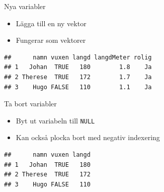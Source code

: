 \documentclass[
  11pt,
  ignorenonframetext,
]{beamer}
\newenvironment{Shaded}{\begin{snugshade}}{\end{snugshade}}
\newcommand{\DecValTok}[1]{\textcolor[rgb]{0.00,0.00,0.81}{#1}}
\newcommand{\FloatTok}[1]{\textcolor[rgb]{0.00,0.00,0.81}{#1}}
\newcommand{\KeywordTok}[1]{\textcolor[rgb]{0.13,0.29,0.53}{\textbf{#1}}}
\newcommand{\NormalTok}[1]{#1}
\newcommand{\OperatorTok}[1]{\textcolor[rgb]{0.81,0.36,0.00}{\textbf{#1}}}
\newcommand{\OtherTok}[1]{\textcolor[rgb]{0.56,0.35,0.01}{#1}}
\newcommand{\StringTok}[1]{\textcolor[rgb]{0.31,0.60,0.02}{#1}}
\providecommand{\tightlist}{%
  \setlength{\itemsep}{0pt}\setlength{\parskip}{0pt}}
\begin{document}
\begin{frame}[fragile]{Nya variabler}
\protect\hypertarget{nya-variabler}{}
\begin{itemize}
\tightlist
\item
  Lägga till en ny vektor
\item
  Fungerar som vektorer
\end{itemize}

\begin{Shaded}
\end{Shaded}

\begin{verbatim}
##      namn vuxen langd langdMeter rolig
## 1   Johan  TRUE   180        1.8    Ja
## 2 Therese  TRUE   172        1.7    Ja
## 3    Hugo FALSE   110        1.1    Ja
\end{verbatim}
\end{frame}

\begin{frame}[fragile]{Ta bort variabler}
\protect\hypertarget{ta-bort-variabler}{}
\begin{itemize}
\tightlist
\item
  Byt ut variabeln till \texttt{NULL}
\item
  Kan också plocka bort med negativ indexering
\end{itemize}

\begin{Shaded}
\end{Shaded}

\begin{verbatim}
##      namn vuxen langd
## 1   Johan  TRUE   180
## 2 Therese  TRUE   172
## 3    Hugo FALSE   110
\end{verbatim}
\end{frame}
\end{document}
